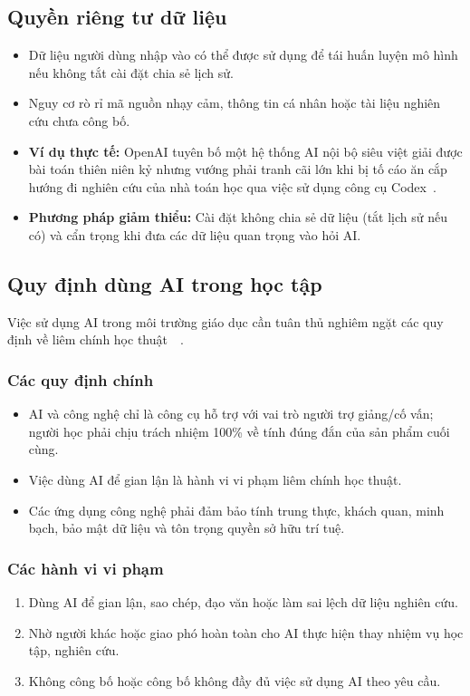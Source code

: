 \documentclass[12pt,a4paper]{article}
\begin{document}
\subsection{Quyền riêng tư dữ liệu}
\begin{itemize}
  \item Dữ liệu người dùng nhập vào có thể được sử dụng để tái huấn luyện mô hình nếu không tắt cài đặt chia sẻ lịch sử.
  \item Nguy cơ rò rỉ mã nguồn nhạy cảm, thông tin cá nhân hoặc tài liệu nghiên cứu chưa công bố.
  \item \textbf{Ví dụ thực tế:} OpenAI tuyên bố một hệ thống AI nội bộ siêu việt giải được bài toán thiên niên kỷ nhưng vướng phải tranh cãi lớn khi bị tố cáo ăn cắp hướng đi nghiên cứu của nhà toán học qua việc sử dụng công cụ Codex~\cite{cafef-openai-dispute}.
  \item \textbf{Phương pháp giảm thiểu:} Cài đặt không chia sẻ dữ liệu (tắt lịch sử nếu có) và cẩn trọng khi đưa các dữ liệu quan trọng vào hỏi AI.
\end{itemize}

\subsection{Quy định dùng AI trong học tập}
Việc sử dụng AI trong môi trường giáo dục cần tuân thủ nghiêm ngặt các quy định về liêm chính học thuật~\cite{thuvienphapluat-ai-giaoduc}~\cite{ghimire2024generativeaieducationstudy}.

\subsubsection{Các quy định chính}
\begin{itemize}
  \item AI và công nghệ chỉ là công cụ hỗ trợ với vai trò người trợ giảng/cố vấn; người học phải chịu trách nhiệm 100\% về tính đúng đắn của sản phẩm cuối cùng.
  \item Việc dùng AI để gian lận là hành vi vi phạm liêm chính học thuật.
  \item Các ứng dụng công nghệ phải đảm bảo tính trung thực, khách quan, minh bạch, bảo mật dữ liệu và tôn trọng quyền sở hữu trí tuệ.
\end{itemize}

\subsubsection{Các hành vi vi phạm}
\begin{enumerate}
  \item Dùng AI để gian lận, sao chép, đạo văn hoặc làm sai lệch dữ liệu nghiên cứu.
  \item Nhờ người khác hoặc giao phó hoàn toàn cho AI thực hiện thay nhiệm vụ học tập, nghiên cứu.
  \item Không công bố hoặc công bố không đầy đủ việc sử dụng AI theo yêu cầu.
\end{enumerate}
\end{document}
